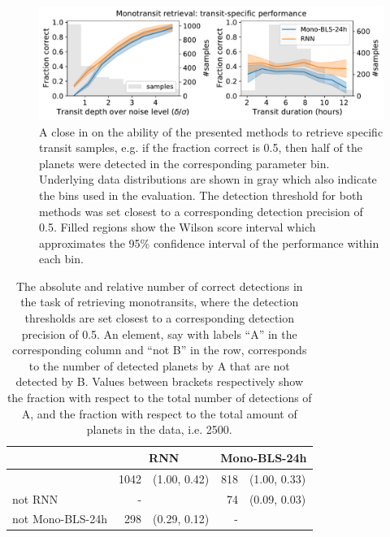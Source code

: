 \begin{figure}
    \centering
    \includegraphics[width=0.7\linewidth]{Experiments/Figures/Monos/mono_transit_specific.pdf}
    \caption{A close in on the ability of the presented methods to retrieve specific transit samples, e.g. if the fraction correct is 0.5, then half of the planets were detected in the corresponding parameter bin. Underlying data distributions are shown in gray which also indicate the bins used in the evaluation. The detection threshold for both methods was set closest to a corresponding detection precision of 0.5. Filled regions show the Wilson score interval \citep{wilson1927probable} which approximates the 95\% confidence interval of the performance within each bin.}
    \label{fig:mono_transits}
\end{figure}

\begin{table}[]
\label{tab:mono_AnotB}
\centering
\begin{tabular}{@{}lrlrl@{}}
\toprule
                 & \multicolumn{2}{c}{RNN} & \multicolumn{2}{c}{Mono-BLS-24h} \\ \midrule
                 & 1042   & (1.00, 0.42)   & 818        & (1.00, 0.33)        \\
not RNN          & -      &                & 74         & (0.09, 0.03)        \\
not Mono-BLS-24h & 298    & (0.29, 0.12)   & -          &                     \\ \bottomrule
\end{tabular}
\caption{The absolute and relative number of correct detections in the task of retrieving monotransits, where the detection thresholds are set closest to a corresponding detection precision of 0.5. An element, say with labels ``A'' in the corresponding column and ``not B'' in the row, corresponds to the number of detected planets by A that are not detected by B. Values between brackets respectively show the fraction with respect to the total number of detections of A, and the fraction with respect to the total amount of planets in the data, i.e. 2500.}
\end{table}
